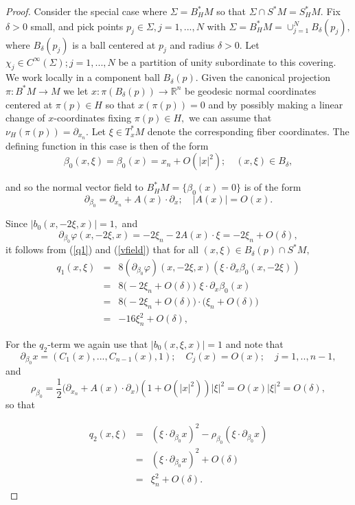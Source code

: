 \documentclass[11pt,reqno]{amsart}
\newcommand{\R}{{\mathbb R}}
\theoremstyle{definition}
\begin{document}
\begin{proof} Consider the special case where $\Sigma = B_H^*M$ so that $\Sigma \cap S^*M = S_H^*M.$ Fix $\delta >0$ small, and pick points $p_j \in \Sigma, j=1,...,N$ with $\Sigma = B_H^*M = \cup_{j=1}^N B_{\delta}(p_j),$ where $B_{\delta}(p_j)$ is a ball centered at $p_j$ and radius $\delta >0.$ Let $\chi_j \in C^{\infty}(\Sigma); j=1,...,N$ be a partition of unity subordinate to this covering. 
We work locally in a component ball $B_{\delta}(p).$ Given the canonical projection $\pi: B^*M \to M$ we let $x: \pi(B_\delta(p)) \to \R^n$ be geodesic normal coordinates centered at $\pi(p) \in H$ so that $x(\pi(p)) = 0$ and by possibly making a linear change of $x$-coordinates fixing $\pi(p) \in H,$ we can assume that 
$\nu_H(\pi(p)) =  \partial_{x_n}.$ Let $\xi \in T^*_xM$ denote the corresponding fiber coordinates.  The defining function in this case is then of the form
$$\beta_0(x,\xi) = \beta_0(x) = x_n + O(|x|^2); \quad  (x,\xi) \in B_{\delta},$$

and so the normal vector field to $B_H^*M = \{ \beta_0 (x) = 0 \}$ is of the form
\begin{equation} \label{vfield}
\partial_{\beta_0} = \partial_{x_n} + A(x) \cdot \partial_{x}; \quad |A(x)| = O(x).
\end{equation}

Since $|b_0(x,-2\xi,x)|  = 1,$ and
$$ \partial_{\beta_0}\varphi(x,-2\xi,x) = -2 \xi_n - 2 A(x) \cdot \xi = -2\xi_n + O(\delta),$$
 it follows from (\ref{q1}) and (\ref{vfield}) that for all $(x,\xi) \in B_\delta(p) \cap S^*M,$
\begin{eqnarray} \label{q1term}
q_1(x,\xi) &=& 8 (\partial_{\beta_0}\varphi)(x,-2\xi,x)(\xi\cdot\partial_x\beta_0(x,-2\xi)) \nonumber \\
&=& 8 \big(-2 \xi_n + O(\delta) \big) \,\, \xi \cdot \partial_x \beta_0(x) \nonumber\\
&=&  8 \big(-2 \xi_n + O(\delta) \big) \cdot \big(\xi_n + O(\delta) \big) \nonumber \\
&=& - 16 \xi_n^2 + O(\delta), \quad 
\end{eqnarray}

For the $q_2$-term we again use that $|b_0(x,\xi,x)| = 1$ and note that
$$ \partial_{\beta_0} x  = (C_1(x),...,C_{n-1}(x), 1); \quad C_j(x) = O(x);\quad j=1,..,n-1,$$
and
$$ \rho_{\beta_0} = \frac{1}{2} \big( \partial_{x_n} + A(x) \cdot \partial_x \big) ( 1 + O(|x|^2)) |\xi|^2 = O(x) |\xi|^2 = O(\delta),$$
so that

\begin{eqnarray} \label{q2term}
q_2(x,\xi) &=& (\xi\cdot\partial_{\beta_0}x)^2-\rho_{\beta_0}(\xi\cdot\partial_{\beta_0}x) \nonumber \\
&=&  (\xi\cdot\partial_{\beta_0}x)^2 + O(\delta) \nonumber \\
&=& \xi_n^2 + O(\delta).
\end{eqnarray}


\end{proof}
\end{document}
